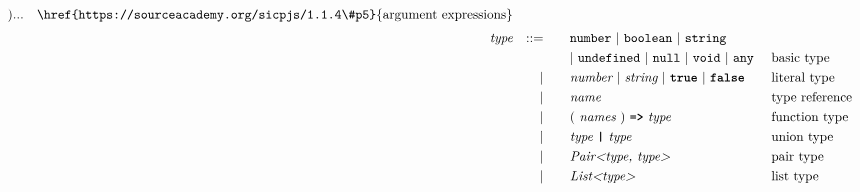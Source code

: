 \begin{alignat*}{9}
                                                                      ) ...
                                                            && \textrm{\href{https://sourceacademy.org/sicpjs/1.1.4\#p5}{argument expressions}}\\[1mm]
&& \textit{type}         && ::= &\quad &&  \texttt{number}\ |\ \texttt{boolean}\ |\ \texttt{string} \\
&&                       &&     &      &&  |\ \texttt{undefined}\ |\ \texttt{null}\ |\ \texttt{void}\ |\ \texttt{any}\ && \textrm{basic type}\\
&&                       && |   &\quad &&  \textit{number}\ |\ \textit{string}\ |\ \textbf{\texttt{true}}\ |\ \textbf{\texttt{false}} && \textrm{literal type}\\
&&                       && |   &\quad &&  \textit{name}   && \textrm{type reference}\\
&&                       && |   &\quad &&   (\ \textit{names}\ )\ \texttt{\textbf{=>}}\ \textit{type} && \textrm{function type}\\
&&                       && |   &\quad &&   \textit{type}\ \texttt{\textbf{|}}\ \textit{type} && \textrm{union type}\\
&&                       && |   &\quad &&   \textit{Pair<type, type>} && \textrm{pair type}\\
&&                       && |   &\quad &&   \textit{List<type>} && \textrm{list type}\\
\end{alignat*}
